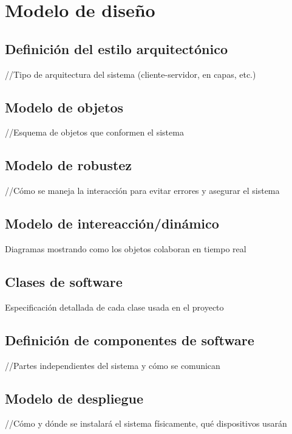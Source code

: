 \documentclass[12pt, letterpaper]{article}
\begin{document}
\section{\textbf{Modelo de diseño}}
\subsection{Definición del estilo arquitectónico}
//Tipo de arquitectura del sistema (cliente-servidor, en capas, etc.)\\

\subsection{Modelo de objetos}
//Esquema de objetos que conformen el sistema\\

\subsection{Modelo de robustez}
//Cómo se maneja la interacción para evitar errores y asegurar el sistema\\
\subsection{Modelo de intereacción/dinámico}
Diagramas mostrando como los objetos colaboran en tiempo real\\
\subsection{Clases de software}
Especificación detallada de cada clase usada en el proyecto\\

\subsection{Definición de componentes de software}
//Partes independientes del sistema y cómo se comunican\\

\subsection{Modelo de despliegue}
//Cómo y dónde se instalará el sistema físicamente, qué dispositivos usarán\\
\end{document}
